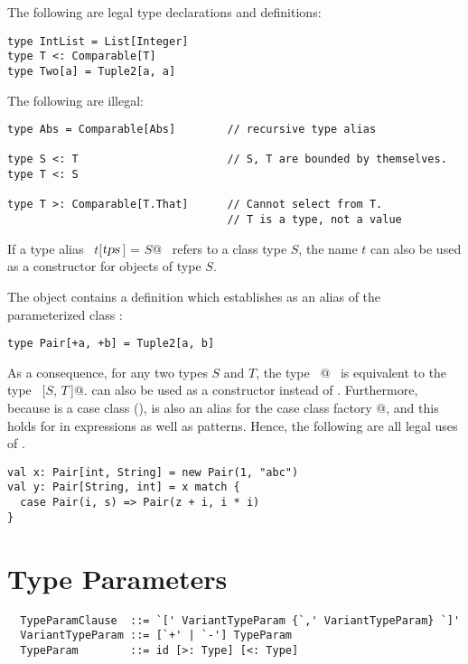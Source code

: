 \example The following are legal type declarations and definitions:
\begin{lstlisting}
type IntList = List[Integer]
type T <: Comparable[T]
type Two[a] = Tuple2[a, a]
\end{lstlisting}

The following are illegal:
\begin{lstlisting}
type Abs = Comparable[Abs]        // recursive type alias

type S <: T                       // S, T are bounded by themselves.
type T <: S

type T >: Comparable[T.That]      // Cannot select from T.
                                  // T is a type, not a value
\end{lstlisting}

If a type alias ~\lstinline@type $t$[$\mbox{\sl tps}\,$] = $S$@~ refers to a class type
$S$, the name $t$ can also be used as a constructor for
objects of type $S$.

\example The  object contains a definition which establishes  
as an alias of the parameterized class :
\begin{lstlisting}
type Pair[+a, +b] = Tuple2[a, b] 
\end{lstlisting}
As a consequence, for any two types $S$ and $T$, the type
~\lstinline@Pair[$S$, $T\,$]@~ is equivalent to the type ~[$S$, $T\,$]@.
 can also be used as a constructor instead of .
Furthermore, because  is a case class (),
 is also an alias for the case class factory @, and this holds
for in expressions as well as patterns. Hence, the following are all legal uses of \lstinline@Pair@.
\begin{lstlisting}
val x: Pair[int, String] = new Pair(1, "abc")
val y: Pair[String, int] = x match {
  case Pair(i, s) => Pair(z + i, i * i)
}
\end{lstlisting}

\section{Type Parameters}\label{sec:type-params}

\syntax\begin{lstlisting}
  TypeParamClause  ::= `[' VariantTypeParam {`,' VariantTypeParam} `]'
  VariantTypeParam ::= [`+' | `-'] TypeParam
  TypeParam        ::= id [>: Type] [<: Type]
\end{lstlisting}


